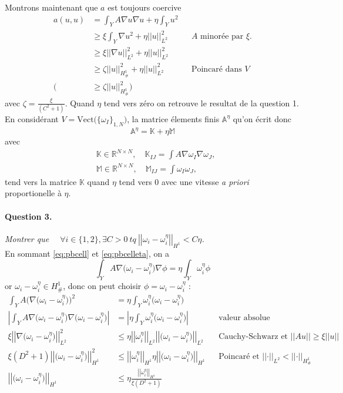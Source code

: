 \message{ !name(rapport.tex)}\documentclass[11pt]{article}
\newcommand{\Am}{\mathbb{A}}
\newcommand{\R}{\mathbb{R}}
\newcommand{\K}{\mathbb{K}}
\newcommand{\M}{\mathbb{M}}
\newcommand{\norm}[1]{\left|\left|#1\right|\right|}
\newcommand{\question}[2]{\paragraph{Question #1.}\textit{#2} \\}
\newcommand{\Hd}{H^1_{\#}}
\begin{document}
Montrons maintenant que $a$ est toujours coercive
\begin{align}
  \label{eq:co}
  a(u,u) &= \int_Y A \nabla u  \nabla u + \eta \int_Y u^2 \\
         &\geq \xi \int_Y \nabla u^2 + \eta \norm{u}^2_{L^2} && \text{$A$ minorée par $\xi$.}\\
         &\geq \xi \norm{\nabla u}^2_{L^2} + \eta \norm{u}^2_{L^2} \\
         &\geq \zeta \norm{u}^2_{\Hd} + \eta \norm{ u}^2_{L^2} && \text{Poincaré dans }V\\
    \big(&\geq \zeta  \norm{u}^2_{\Hd}\big)
\end{align} 
avec $\zeta = \frac{\xi}{(C^2+1)}$. Quand $\eta$ tend vers zéro on retrouve le resultat de la question 1. En considérant $V = \text{Vect}\big(\{\omega_I\}_{1,N})$, la matrice élements finis $\Am^{\eta}$ qu'on écrit donc
\begin{equation}
  \Am^{\eta} = \K + \eta \M 
\end{equation}
avec
\begin{align}
  &\K \in \R^{N\times N},\quad \K_{IJ} = \int A \nabla \omega_I \nabla \omega_J,  \\
  &\M \in \R^{N\times N},\quad \M_{IJ} = \int \omega_I \omega_J,
\end{align}
tend vers la matrice $\K$ quand $\eta$ tend vers $0$ avec une vitesse \emph{a priori} proportionelle à $\eta$.

\question{3}{Montrer que $\quad\forall i \in \{1,2\}, \exists C>0 ~tq~ \norm{\omega_i-\omega_i^\eta}_{H^1} < C \eta$.}
En sommant \autoref{eq:pbcell} et \autoref{eq:pbcelleta}, on a
\begin{equation}
  \int_Y A \nabla \big(\omega_i-\omega_i^\eta\big) \nabla \phi = \eta \int_Y \omega_i^\eta \phi
\end{equation}
or $\omega_i-\omega_i^\eta\in\Hd$, donc on peut choisir $\phi=\omega_i-\omega_i^\eta$ :
\begin{align}
  \int_Y A \big(\nabla \big(\omega_i-\omega_i^\eta\big)\big)^2 &= \eta \int_Y \omega_i^\eta \big(\omega_i-\omega_i^\eta\big) \\
  \left| \int_Y A \nabla \big(\omega_i-\omega_i^\eta\big) \nabla \big(\omega_i-\omega_i^\eta\big) \right| &= \left| \eta \int_Y \omega_i^\eta \big(\omega_i-\omega_i^\eta\big) \right| && \text{valeur absolue} \\
  \xi \norm{\nabla \big(\omega_i-\omega_i^\eta \big)}_{L^2}^2 &\leq \eta \norm{\omega_i^\eta}_{L^2} \norm{\big(\omega_i-\omega_i^\eta \big)}_{L^2} && \text{Cauchy-Schwarz et } \norm{Au}\geq\xi \norm{u} \\
  \xi (D^2+1) \norm{\big(\omega_i-\omega_i^\eta \big)}_{H^1}^2 &\leq \norm{\omega_i^\eta}_{H^1}\eta \norm{\big(\omega_i-\omega_i^\eta \big)}_{H^1} && \text{Poincaré et }\norm{\cdot}_{L^2}<\norm{\cdot}_{\Hd} \\
  \norm{\big(\omega_i-\omega_i^\eta \big)}_{H^1} &\leq \eta \frac{\norm{\omega_i^\eta}_{H^1}}{\xi (D^2+1)}
\end{align}
\end{document}
